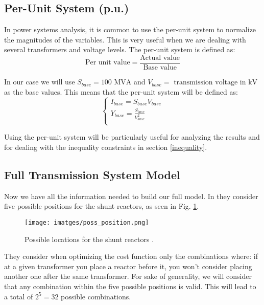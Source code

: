 \documentclass[a4paper,11pt, titlepage, twoside]{article}
\begin{document}
\subsection{Per-Unit System (p.u.)}

In power systems analysis, it is common to use the per-unit system to normalize the magnitudes of the variables. This is very useful when we are dealing with several transformers and voltage levels. 
The per-unit system is defined as:
\begin{equation}
    \text{Per unit value} = \frac{\text{Actual value}}{\text{Base value}}
\end{equation}

In our case we will use $S_{base} =100 \text{ MVA}$ and $V_{base} = \text{ transmission voltage in kV}$ as the base values. This means that the per-unit system will be defined as:
\begin{equation}
    \begin{cases}
        I_{base} = S_{base}V_{base} \\
        Y_{base} = \frac{S_{base}}{V_{base}^2} \\
    \end{cases}
\end{equation}

Using the per-unit system will be particularly useful for analyzing the results and for dealing with the inequality constraints in section \ref{inequality}.

\subsection{Full Transmission System Model}

Now we have all the information needed to build our full model. In \cite{paperbase} they consider five possible positions for the shunt reactors, as seen in Fig. \ref{fig:poss_position}. 
\begin{figure}[H]
    \centering
	\texttt{[image: imatges/poss\_position.png]}
	\caption{Possible locations for the shunt reactors \cite{paperbase}.}
    \label{fig:poss_position}
\end{figure}



They consider when optimizing the cost function only the combinations where: if at a given transformer you place a reactor before it, you won't consider placing another one
after the same transformer. For sake of generality, we will consider that any combination within the five possible positions is valid. This will lead to a total of $2^5 = 32$ possible combinations.
\end{document}
